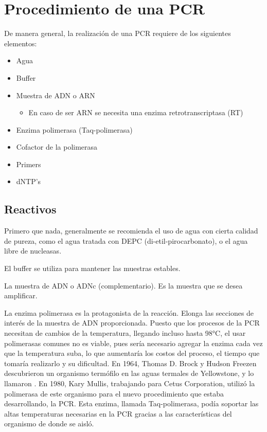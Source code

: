 \section{Procedimiento de una PCR}

De manera general, la realización de una PCR requiere de los siguientes elementos:

\begin{itemize}
    \item Agua
    \item Buffer
    \item Muestra de ADN o ARN
    \begin{itemize}
        \item En caso de ser ARN se necesita una enzima retrotranscriptasa (RT)
    \end{itemize}
    \item Enzima polimerasa (Taq-polimerasa)
    \item Cofactor de la polimerasa
    \item Primers
    \item dNTP's
\end{itemize}

\subsection{Reactivos}

Primero que nada, generalmente se recomienda el uso de agua con cierta calidad de pureza, como el agua tratada con DEPC (di-etil-pirocarbonato), o el agua libre de nucleasas.

El buffer se utiliza para mantener las muestras estables.

La muestra de ADN o ADNc (complementario). Es la muestra que se desea amplificar.

La enzima polimerasa es la protagonista de la reacción. Elonga las secciones de interés de la muestra de ADN proporcionada. Puesto que los procesos de la PCR necesitan de cambios de la temperatura, llegando incluso hasta 98°C, el usar polimerasas comunes no es viable, pues sería necesario agregar la enzima cada vez que la temperatura suba, lo que aumentaría los costos del proceso, el tiempo que tomaría realizarlo y su dificultad. En 1964, Thomas D. Brock y Hudson Freezen descubrieron un organismo termófilo en las aguas termales de Yellowstone, y lo llamaron . En 1980, Kary Mullis, trabajando para Cetus Corporation, utilizó la polimerasa de este organismo para el nuevo procedimiento que estaba desarrollando, la PCR. Esta enzima, llamada Taq-polimerasa, podía soportar las altas temperaturas necesarias en la PCR gracias a las características del organismo de donde se aisló.

